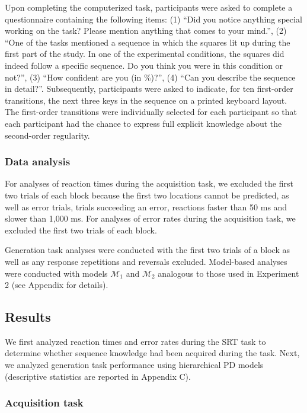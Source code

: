 \documentclass[english,,man]{apa6}
\begin{document}
Upon completing the computerized task, participants were asked to complete a questionnaire containing the following items:
(1) \enquote{Did you notice anything special working on the task? Please mention anything that comes to your mind.},
(2) \enquote{One of the tasks mentioned a sequence in which the squares lit up during the first part of the study.
In one of the experimental conditions, the squares did indeed follow a specific sequence. Do you think you were in this condition or not?},
(3) \enquote{How confident are you (in \%)?}, (4) \enquote{Can you describe the sequence in detail?}.
Subsequently, participants were asked to indicate, for ten first-order transitions, the next three keys in the sequence on a printed keyboard layout.
The first-order transitions were individually selected for each participant so that each participant had the chance to express full explicit knowledge about the second-order regularity.

\hypertarget{data-analysis-2}{%
\subsubsection{Data analysis}\label{data-analysis-2}}

For analyses of reaction times during the acquisition task, we excluded the first two trials of each block because the first two locations cannot be predicted, as well as error trials, trials succeeding an error, reactions faster than 50 ms and slower than 1,000 ms.
For analyses of error rates during the acquisition task, we excluded the first two trials of each block.

Generation task analyses were conducted with the first two trials of a block as well as any response repetitions and reversals excluded.
Model-based analyses were conducted with models \(\mathcal{M}_1\) and \(\mathcal{M}_2\) analogous to those used in Experiment 2 (see Appendix for details).

\hypertarget{results-2}{%
\subsection{Results}\label{results-2}}

We first analyzed reaction times and error rates during the SRT task to determine whether sequence knowledge had been acquired during the task.
Next, we analyzed generation task performance using hierarchical PD models
(descriptive statistics are reported in Appendix C).

\hypertarget{acquisition-task-2}{%
\subsubsection{Acquisition task}\label{acquisition-task-2}}
\end{document}
